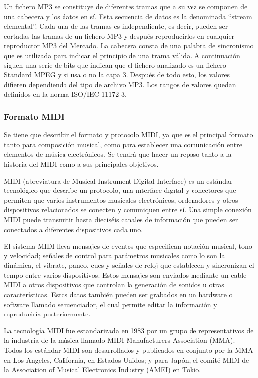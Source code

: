 \documentclass[a4paper,11pt,oneside]{book}
\begin{document}
Un fichero MP3 se constituye de diferentes tramas que a su vez se componen de una cabecera y los datos en sí. Esta secuencia de datos es la denominada ``stream elemental''. Cada una de las tramas es independiente, es decir, pueden ser cortadas las tramas de un fichero MP3 y después reproducirlos en cualquier reproductor MP3 del Mercado. La cabecera consta de una palabra de sincronismo que es utilizada para indicar el principio de una trama válida. A continuación siguen una serie de bits que indican que el fichero analizado es un fichero Standard MPEG y si usa o no la capa 3. Después de todo esto, los valores difieren dependiendo del tipo de archivo MP3. Los rangos de valores quedan definidos en la norma ISO/IEC 11172-3.

\subsubsection{Formato MIDI}
Se tiene que describir el formato y protocolo MIDI, ya que es el principal formato tanto para composición musical, como para establecer una comunicación entre elementos de música electrónicos. Se tendrá que hacer un repaso tanto a la historia del MIDI como a sus principales objetivos.

MIDI (abreviatura de Musical Instrument Digital Interface) es un estándar tecnológico que describe un protocolo, una interface digital y conectores que permiten que varios instrumentos musicales electrónicos, ordenadores y otros dispositivos relacionados se conecten y comuniquen entre sí. Una simple conexión MIDI puede transmitir hasta dieciséis canales de información que pueden ser conectados a diferentes dispositivos cada uno.

El sistema MIDI lleva mensajes de eventos que especifican notación musical, tono y velocidad; señales de control para parámetros musicales como lo son la dinámica, el vibrato, paneo, cues y señales de reloj que establecen y sincronizan el tempo entre varios dispositivos. Estos mensajes son enviados mediante un cable MIDI a otros dispositivos que controlan la generación de sonidos u otras características. Estos datos también pueden ser grabados en un hardware o software llamado secuenciador, el cual permite editar la información y reproduciría posteriormente.

La tecnología MIDI fue estandarizada en 1983 por un grupo de representativos de la industria de la música llamado MIDI Manufacturers Association (MMA). Todos los estándar MIDI son desarrollados y publicados en conjunto por la MMA en Los Angeles, California, en Estados Unidos; y para Japón, el comité MIDI de la Association of Musical Electronics Industry (AMEI) en Tokio.
\end{document}
